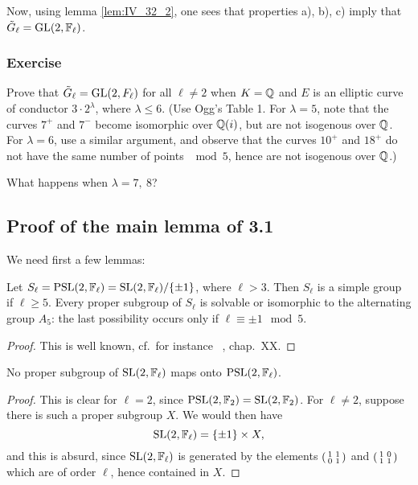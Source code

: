 Now, using lemma \ref{lem:IV_32_2}, one sees that properties a), b), c) imply
that $\tilde{G}_\ell = \operatorname{GL}(2, \mathbb{F}_\ell)$.  

\subsubsection*{Exercise}

Prove that $\tilde{G}_\ell = \operatorname{GL}(2, F_\ell)$ for all $\ell \neq 2$ when $K = \mathbb{Q}$
and $E$ is an elliptic curve of conductor $3 \cdot 2^\lambda$, where $\lambda
\leq 6$. (Use Ogg's Table 1. For $\lambda = 5$, note that the curves $7^+$ and
$7^-$ become isomorphic over $\mathbb{Q}(i)$, but are not isogenous over $\mathbb{Q}$. For
$\lambda = 6$, use a similar argument, and observe that the curves $10^+$ and
$18^+$ do not have the same number of points $\mod 5$, hence are not isogenous
over $\mathbb{Q}$.)

What happens when $\lambda = 7,~8$?

\subsection{Proof of the main lemma of 3.1}
\label{sec:IV_34}
\dpage
We need first a few lemmas:
\begin{lem}\label{lem:IV_34_1}
	Let $S_\ell = \operatorname{PSL}(2, \mathbb{F}_\ell) = \operatorname{SL}(2, \mathbb{F}_\ell)/\{ \pm 1 \}$, where
	$\ell > 3$.
	Then $S_\ell$ is a simple group if $\ell \ge 5$. Every proper subgroup
	of $S_\ell$ is solvable or isomorphic to the alternating group $A_5$:
	the last possibility occurs only if $\ell \equiv \pm 1 \mod 5$.
\end{lem}
\begin{proof}
	This is well known, cf.\ for instance \citeauthor{4}~\cite{4}, chap.\ XX.
\end{proof}

\begin{lem}\label{lem:IV_34_2}
	No proper subgroup of $\operatorname{SL}(2, \mathbb{F}_\ell)$ maps onto $\operatorname{PSL}(2, \mathbb{F}_\ell)$.
\end{lem}
\begin{proof}
	This is clear for $\ell = 2$, since $\operatorname{PSL}(2, \mathbb{F}_2) = \operatorname{SL}(2, \mathbb{F}_2)$. For
	$\ell \ne 2$, suppose there is such a proper subgroup $X$. We would then
	have
	\[
		\operatorname{SL}(2, \mathbb{F}_\ell) = \{ \pm 1 \}\times X,
	\]
	and this is absurd, since $\operatorname{SL}(2, \mathbb{F}_\ell)$ is generated by the elements
	$\begin{psmallmatrix}
		1 & 1 \\
		0 & 1
	\end{psmallmatrix}$
	and
	$\begin{psmallmatrix}
		1 & 0 \\
		1 & 1
	\end{psmallmatrix}$
	which are of order $\ell$, hence contained in $X$.
\end{proof}

